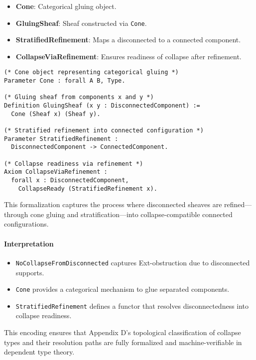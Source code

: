 \documentclass[11pt]{article}
\begin{document}
\begin{itemize}
  \item \textbf{Cone}: Categorical gluing object.
  \item \textbf{GluingSheaf}: Sheaf constructed via \texttt{Cone}.
  \item \textbf{StratifiedRefinement}: Maps a disconnected to a connected component.
  \item \textbf{CollapseViaRefinement}: Ensures readiness of collapse after refinement.
\end{itemize}

\noindent
\begin{lstlisting}[language=Coq, breaklines=true]
(* Cone object representing categorical gluing *)
Parameter Cone : forall A B, Type.

(* Gluing sheaf from components x and y *)
Definition GluingSheaf (x y : DisconnectedComponent) :=
  Cone (Sheaf x) (Sheaf y).

(* Stratified refinement into connected configuration *)
Parameter StratifiedRefinement :
  DisconnectedComponent -> ConnectedComponent.

(* Collapse readiness via refinement *)
Axiom CollapseViaRefinement :
  forall x : DisconnectedComponent,
    CollapseReady (StratifiedRefinement x).
\end{lstlisting}


This formalization captures the process where disconnected sheaves are refined—through cone gluing  
and stratification—into collapse-compatible connected configurations.

\paragraph{Interpretation}

\begin{itemize}
  \item \texttt{NoCollapseFromDisconnected} captures Ext-obstruction due to disconnected supports.
  \item \texttt{Cone} provides a categorical mechanism to glue separated components.
  \item \texttt{StratifiedRefinement} defines a functor that resolves disconnectedness into collapse readiness.
\end{itemize}

This encoding ensures that Appendix D's topological classification of collapse types and their  
resolution paths are fully formalized and machine-verifiable in dependent type theory.
\end{document}

